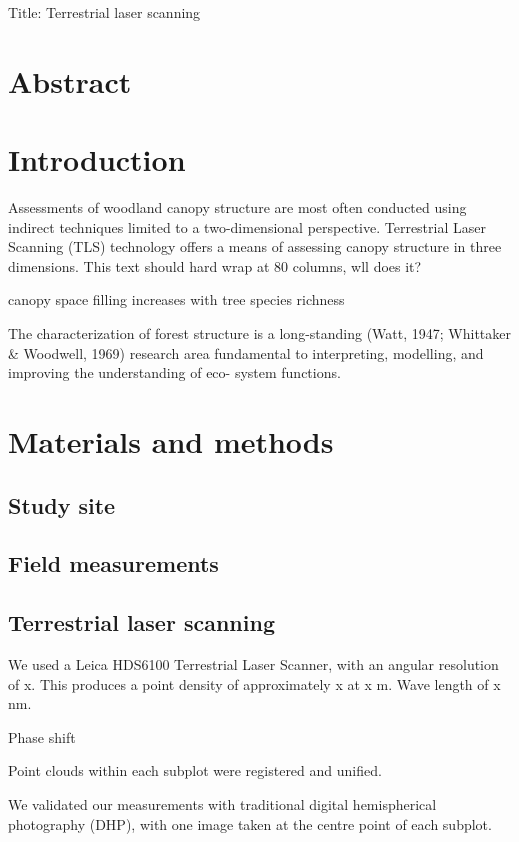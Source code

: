 \documentclass[11pt,a4paper]{article}
\newcommand{\titletext}{Terrestrial laser scanning}
\begin{document}
{\Large{Title: \titletext{}}}


\section*{Abstract}

\section{Introduction}

Assessments of woodland canopy structure are most often conducted using indirect
techniques limited to a two-dimensional perspective. Terrestrial Laser Scanning
(TLS) technology offers a means of assessing canopy structure in three
dimensions. This text should hard wrap at 80 columns, wll does it?

 canopy space filling increases with tree species richness

The characterization of forest structure is a long-standing (Watt, 1947; Whittaker & Woodwell, 1969) research area fundamental to interpreting, modelling, and improving the understanding of eco- system functions. 

\section{Materials and methods}

\subsection{Study site}

\subsection{Field measurements}

\subsection{Terrestrial laser scanning}

We used a Leica HDS6100 Terrestrial Laser Scanner, with an angular resolution of
x. This produces a point density of approximately x at x m. Wave length of x nm.

Phase shift

Point clouds within each subplot were registered and unified.

We validated our measurements with traditional digital hemispherical photography
(DHP), with one image taken at the centre point of each subplot.
\end{document}
